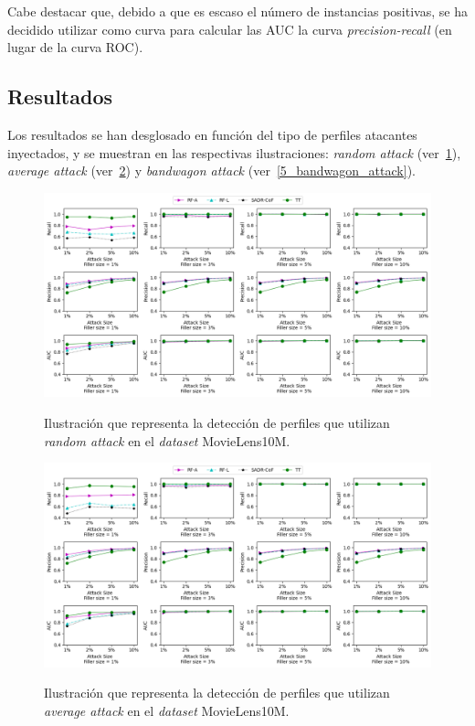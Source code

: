 Cabe destacar que, debido a que es escaso el número de instancias positivas, se ha decidido utilizar como curva para calcular las AUC la curva \textit{precision-recall} (en lugar de la curva ROC).

\subsection{Resultados}

Los resultados se han desglosado en función del tipo de perfiles atacantes inyectados, y se muestran en las respectivas ilustraciones: \textit{random attack} (ver~\ref{5_random_attack}), \textit{average attack} (ver~\ref{5_average_attack}) y \textit{bandwagon attack} (ver~\ref{5_bandwagon_attack}).

\begin{figure}[h]
	\caption[\textit{Random attack}: detección]{Ilustración que representa la detección de perfiles que utilizan \textit{random attack} en el \textit{dataset} MovieLens10M.}
	\centering
	\includegraphics[width=\textwidth]{../img/memoria/5_resultados_random_attack}
	\label{5_random_attack}
\end{figure}

\begin{figure}[h]
	\caption[\textit{Average attack}: detección]{Ilustración que representa la detección de perfiles que utilizan \textit{average attack} en el \textit{dataset} MovieLens10M.}
	\centering
	\includegraphics[width=\textwidth]{../img/memoria/5_resultados_average_attack}
	\label{5_average_attack}
\end{figure}

